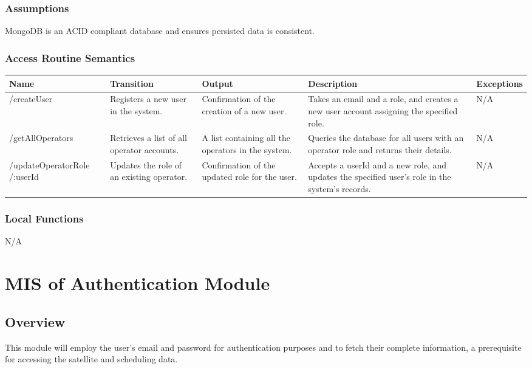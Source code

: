 \documentclass[12pt, titlepage]{article}
\begin{document}
\subsubsection{Assumptions}

MongoDB is an ACID compliant database and ensures persisted data is consistent.

\subsubsection{Access Routine Semantics}

\begin{center}
\begin{tabular}{|p{3.7cm} |p{3cm} | p{3.6cm} |p{4cm} |p{2.3cm}|}
\hline
\textbf{Name} & \textbf{Transition} & \textbf{Output} & \textbf{Description} & \textbf{Exceptions} \\
\hline
/createUser & Registers a new user in the system. & Confirmation of the creation of a new user. & Takes an email and a role, and creates a new user account assigning the specified role. & N/A \\
\hline
/getAllOperators & Retrieves a list of all operator accounts. & A list containing all the operators in the system. & Queries the database for all users with an operator role and returns their details. & N/A \\
\hline


/updateOperatorRole /:userId & Updates the role of an existing operator. & Confirmation of the updated role for the user. & Accepts a userId and a new role, and updates the specified user's role in the system's records. & N/A \\
\hline
\end{tabular}
\end{center}

\subsubsection{Local Functions}

N/A

\section{MIS of Authentication Module} \label{Module} 



\subsection{Overview}
This module will employ the user’s email and password for authentication purposes and to fetch their complete information, a prerequisite for accessing the satellite and scheduling data.
\end{document}
